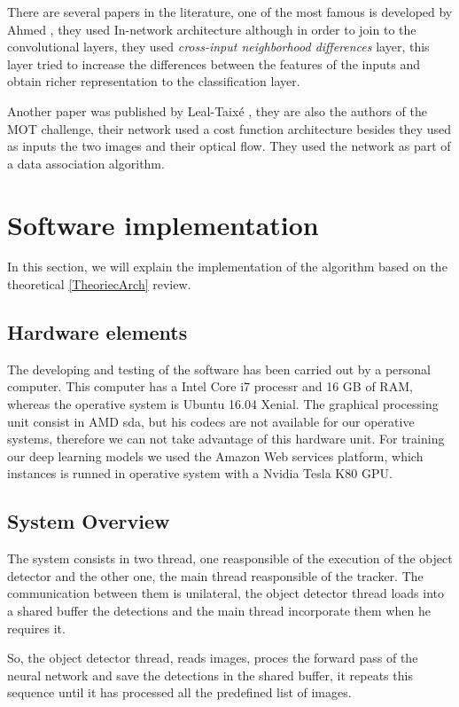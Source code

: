 \documentclass[12pt, a4paper, titlepage,twoside,openright]{article}
\begin{document}
There are several papers in the literature, one of the most famous is developed by Ahmed \cite{ahmed}, they used In-network architecture although in order to join to the convolutional layers, they used \textit{cross-input neighborhood differences} layer, this layer tried to increase the differences between the features of the inputs and obtain richer representation to the classification layer.

Another paper was published by Leal-Taixé \cite{lealTaixe}, they are also the authors of the MOT challenge, their network used a cost function architecture besides they used as inputs the two images and their optical flow. They used the network as part of a data association algorithm.


\section{Software implementation}

In this section, we will explain the implementation of the algorithm based on the theoretical \ref{TheoriecArch} review.

\subsection{Hardware elements}

The developing and testing of the software has been carried out by a personal computer. This computer has a Intel Core i7 processr and 16 GB of RAM, whereas the operative system is Ubuntu 16.04 Xenial. The graphical processing unit consist in AMD sda, but his codecs are not available for our operative systems, therefore we can not take advantage of this hardware unit. For training our deep learning models we used the Amazon Web services platform, which instances is runned in operative system with a Nvidia Tesla K80 GPU.


\subsection{System Overview}


The system consists in two thread, one reasponsible of the execution of the object detector and the other one, the main thread reasponsible of the tracker. The communication between them is unilateral, the object detector thread loads into a shared buffer the detections and the main thread incorporate them when he requires it.

So, the object detector thread, reads images, proces the forward pass of the neural network and save the detections in the shared buffer, it repeats this sequence until it has processed all the predefined list of images.
\end{document}
